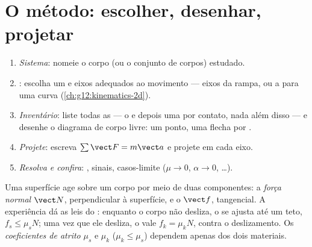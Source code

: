 \section{O método: escolher, desenhar, projetar}

\begin{method}\label{met:g12:newtons-laws:method}
\begin{enumerate}
  \item \emph{Sistema}: nomeie o corpo (ou o conjunto de corpos) estudado.
  \item \emph{}: escolha um  e eixos adequados ao
        movimento --- eixos da rampa, ou a  para uma curva
        (\cref{ch:g12:kinematics-2d}).
  \item \emph{Inventário}: liste todas as  --- o  e depois uma  por
        contato, nada além disso --- e desenhe o diagrama de corpo livre: um ponto,
        uma flecha por .
  \item \emph{Projete}: escreva $\sum \vect F = m\vect a$ e projete em cada eixo.
  \item \emph{Resolva e confira}: , sinais, casos-limite ($\mu \to 0$,
        $\alpha \to 0$, \dots).
\end{enumerate}
\end{method}

\begin{definition}\label{def:g12:newtons-laws:friction}
Uma superfície age sobre um corpo por meio de duas componentes: a \emph{força
normal} $\vect N$, perpendicular à superfície, e o 
$\vect f$, tangencial. A experiência dá as leis do : enquanto o corpo não
desliza, o  se ajusta até um teto, $f_s \leq \mu_s N$; uma vez que ele
desliza, o  vale $f_k = \mu_k N$, contra o deslizamento. Os
\emph{coeficientes de atrito} $\mu_s$ e $\mu_k$
($\mu_k \leq \mu_s$) dependem apenas dos dois materiais.
\end{definition}

